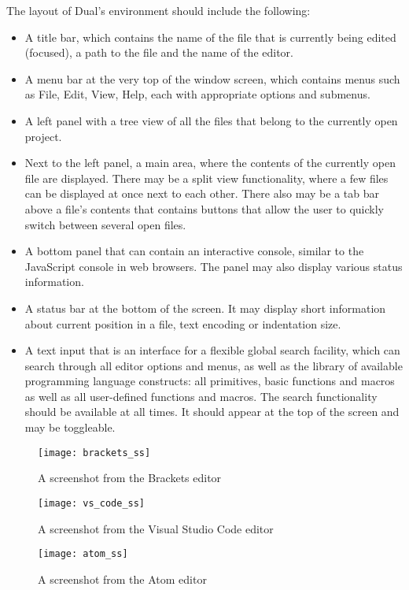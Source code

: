 The layout of Dual's environment should include the following:
\begin{itemize}
\item A title bar, which contains the name of the file that is currently being edited (focused), a path to the file and the name of the editor.
\item A menu bar at the very top of the window screen, which contains menus such as File, Edit, View, Help, each with appropriate options and submenus.
\item A left panel with a tree view of all the files that belong to the currently open project. 
\item Next to the left panel, a main area, where the contents of the currently open file are displayed. There may be a split view functionality, where a few files can be displayed at once next to each other. There also may be a tab bar above a file's contents that contains buttons that allow the user to quickly switch between several open files.
\item A bottom panel that can contain an interactive console, similar to the JavaScript console in web browsers. The panel may also display various status information.
\item A status bar at the bottom of the screen. It may display short information about current position in a file, text encoding or indentation size.
\item A text input that is an interface for a flexible global search facility, which can search through all editor options and menus, as well as the library of available programming language constructs: all primitives, basic functions and macros as well as all user-defined functions and macros. The search functionality should be available at all times. It should appear at the top of the screen and may be toggleable.
\end{itemize}

\begin{figure}[h!]
\centering \texttt{[image: brackets\_ss]}
\caption{
    A screenshot from the Brackets editor
}
\label{fig:brackets_ss}
\end{figure}

\begin{figure}[h!]
\centering \texttt{[image: vs\_code\_ss]}
\caption{
    A screenshot from the Visual Studio Code editor
}
\label{fig:vs_code_ss}
\end{figure}

\begin{figure}[h!]
\centering \texttt{[image: atom\_ss]}
\caption{
    A screenshot from the Atom editor
}
\label{fig:atom_ss}
\end{figure}

